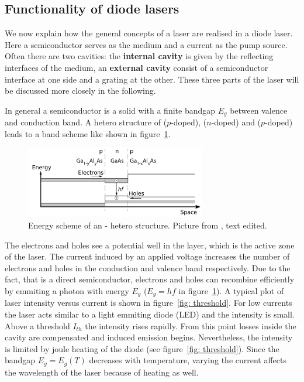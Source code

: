 \subsection{Functionality of diode lasers}
We now explain how the general concepts of a laser are realised in a diode laser. Here a semiconductor serves as the medium and a current as the pump source.
Often there are two cavities: the \textbf{internal cavity} is given by the reflecting interfaces of the medium, an \textbf{external cavity} consist of
a semiconductor interface at one side and a grating at the other. These three parts of the laser will be discussed more closely in the following.

In general a semiconductor is a solid with a finite bandgap $E_g$ between valence and conduction band. A hetero structure of  ($p$-doped),
 ($n$-doped)
and  ($p$-doped) leads to a band scheme like shown in figure~\ref{fig: bandstructure}. 
\begin{figure}
  \centering
  \includegraphics[width = 0.7\textwidth]{pics/hetero_structure.pdf}
  \caption{Energy scheme of an - hetero structure. Picture from \cite{eichler}, text edited.}
  \label{fig: bandstructure}
\end{figure}
The electrons and holes see a potential well
in the  layer, which is the active zone of the laser. The current induced by an applied voltage increases the number of electrons
and holes in the conduction and valence band respectively. Due to the fact, that  is a direct semiconductor, electrons and holes can
recombine efficiently by emmiting a photon with energy $E_g$ ($E_g = hf$ in figure~\ref{fig: bandstructure}). A typical plot of laser intensity versus current is shown in figure~\ref{fig: threshold}. For low
currents the laser acts similar to a light emmiting diode (LED) and the intensity is small. Above a threshold $I_{th}$ the intensity rises rapidly.
From this point losses inside the cavity are compensated and induced emission begins. Nevertheless, the intensity is limited by joule heating
of the diode (see figure~\ref{fig: threshold}). Since the bandgap $E_g = E_g(T)$ decreases with temperature, varying the current affects
the wavelength of the laser because of heating as well.



